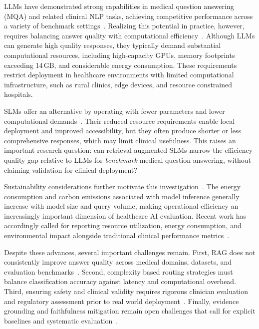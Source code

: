 LLMs have demonstrated strong capabilities in medical question answering (MQA) and related clinical NLP tasks, achieving competitive performance across a variety of benchmark settings~\cite{singhal2025toward}. Realizing this potential in practice, however, requires balancing answer quality with computational efficiency~\cite{singhal2025toward}. Although LLMs can generate high quality responses, they typically demand substantial computational resources, including high-capacity GPUs, memory footprints exceeding 14\,GB, and considerable energy consumption. These requirements restrict deployment in healthcare environments with limited computational infrastructure, such as rural clinics, edge devices, and resource constrained hospitals.

SLMs offer an alternative by operating with fewer parameters and lower computational demands~\cite{xiong2024rag,amugongo2025retrieval}.
 Their reduced resource requirements enable local deployment and improved accessibility, but they often produce shorter or less comprehensive responses, which may limit clinical usefulness. This raises an important research question: can retrieval augmented SLMs narrow the efficiency quality gap relative to LLMs for \emph{benchmark} medical question answering, without claiming validation for clinical deployment?

Sustainability considerations further motivate this investigation~\cite{ren2024reconciling,dauner2025ai}. The energy consumption and carbon emissions associated with model inference generally increase with model size and query volume, making operational efficiency an increasingly important dimension of healthcare AI evaluation. Recent work has accordingly called for reporting resource utilization, energy consumption, and environmental impact alongside traditional clinical performance metrics~\cite{yang2025rag}.

Despite these advances, several important challenges remain. First, RAG does not consistently improve answer quality across medical domains, datasets, and evaluation benchmarks~\cite{yang2025rag}. Second, complexity based routing strategies must balance classification accuracy against latency and computational overhead. Third, ensuring safety and clinical validity requires rigorous clinician evaluation and regulatory assessment prior to real world deployment~\cite{labkoff2024aicds,tam2024quest}. Finally, evidence grounding and faithfulness mitigation remain open challenges that call for explicit baselines and systematic evaluation~\cite{asgari2022hallucination,nishizaki2025reducing}.

